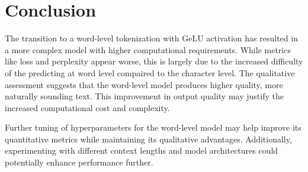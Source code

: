 \documentclass[fontsize=10pt]{article}
\begin{document}
\section{Conclusion}
\vspace{-10pt}
The transition to a word-level tokenization with GeLU activation has resulted in a more 
complex model with higher computational requirements. While metrics like 
loss and perplexity appear worse, this is largely due to the increased difficulty of
the predicting at word level compaired to the character level. The qualitative assessment 
suggests that the word-level model 
produces higher quality, more naturally sounding text. This improvement in output 
quality may justify the increased computational cost and complexity.

Further tuning of hyperparameters for the word-level model may help improve 
its quantitative metrics while maintaining its qualitative advantages. 
Additionally, experimenting with different context lengths and 
model architectures could potentially enhance performance further.


 
\end{document}
